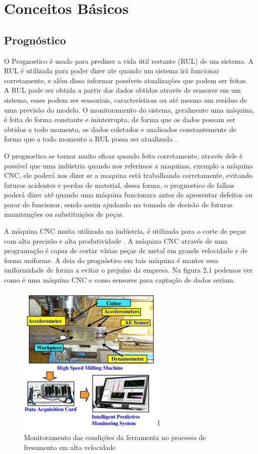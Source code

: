 \chapter{Conceitos Básicos}
\section{Prognóstico}
O Prognostico é usado para predizer a vida útil restante (RUL) de um sistema. A RUL é utilizada para poder dizer ate quando um sistema irá funcionar corretamente, e além disso informar possíveis atualizações que podem ser feitas. A RUL pode ser obtida a partir dos dados obtidos através de sensores em um sistema, esses podem ser sensoriais, características ou até mesmo um resíduo de uma previsão do modelo. O monitoramento do sistema, geralmente uma máquina, é feita de forma constante e ininterrupta, de forma que os dados possam ser obtidos a todo momento, os dados coletados e analisados constantemente de forma que a todo momento a RUL possa ser atualizada \cite{liao2014discovering}.

O prognostico se tornar muito eficaz quando feito corretamente, através dele é possível que uma indústria quando nos referimos a maquinas, exemplo a máquina CNC, ele poderá nos dizer se a maquina está trabalhando corretamente, evitando futuros acidentes e perdas de material, dessa forma, o prognostico de falhas poderá dizer até quando uma máquina funcionara antes de apresentar defeitos ou parar de funcionar, sendo assim ajudando na tomada de decisão de futuras manutenções ou substituições de peças.

A máquina CNC muito utilizada na indústria, é utilizada para o corte de peças com alta precisão e alta produtividade \cite{inacioprognostico}. A máquina CNC através de uma programação é capaz de cortar várias peças de metal em grande velocidade e de forma uniforme. A deia do prognóstico em tais máquina é manter essa uniformidade de forma a evitar o prejuízo da empresa. Na figura 2.1 podemos ver como é uma máquina CNC e como sensores para captação de dados seriam.



\begin{figure}[h]
    \centering
    \includegraphics[scale=1]{img/CNC}
    \caption{Monitoramento das condições da ferramenta no processo de fresamento em alta velocidade}
\end{figure}

